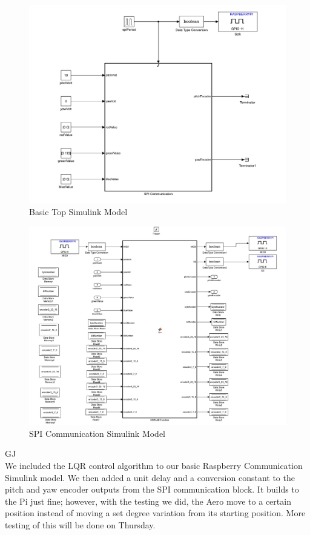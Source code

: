 \documentclass[fontsize=11pt, %
                             paper=letter, %
                             openany, %
                             captions=tableheading,
                             index=totoc,
                             hyperref]{labbook}
\begin{document}
\begin{addmargin}[0cm]{0cm}
\begin{figure}[H]
  \centering
  \includegraphics[width=1\textwidth]{figs/img/Basic_PI}
  \caption{Basic Top Simulink Model}
  \label{fig:Basic_PI}
\end{figure}

\begin{figure}[H]
  \centering
  \includegraphics[width=1\textwidth]{figs/img/SPI_COM}
  \caption{SPI Communication Simulink Model}
  \label{fig:SPI_COM}
\end{figure}

GJ\\
We included the LQR control algorithm to our basic Raspberry Communication Simulink model.  We then added a unit delay and a conversion constant to the pitch and yaw encoder outputs from the SPI communication block.  It builds to the Pi just fine; however, with the testing we did, the Aero move to a certain position instead of moving a set degree variation from its starting position.  More testing of this will be done on Thursday.


\end{addmargin}
\end{document}
